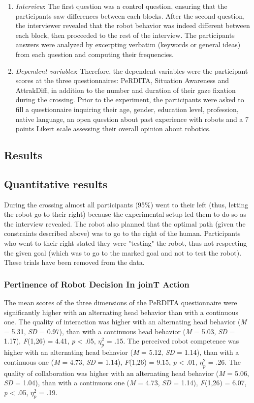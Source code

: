 \documentclass[a4paper,11pt,twoside]{StyleThese}
\begin{document}
\begin{enumerate}
\item \textit{Interview}:
The first question was a control question, ensuring that the participants saw differences between each blocks. After the second question, the interviewer revealed that the robot behavior was indeed different between each block, then proceeded to the rest of the interview. The participants answers were analyzed by excerpting verbatim (keywords or general ideas) from each question and computing their frequencies.

\item \textit{Dependent variables}:
Therefore, the dependent variables were the participant scores at the three questionnaires: PeRDITA, Situation Awareness and AttrakDiff, in addition to the number and duration of their gaze fixation during the crossing.
Prior to the experiment, the participants were asked to fill a questionnaire inquiring their age, gender, education level, profession, native language, an open question about past experience with robots and a 7 points Likert scale assessing their overall opinion about robotics.
\end{enumerate}

\subsection{Results}
\subsection{Quantitative results}
During the crossing almost all participants (95\%) went to their left (thus, letting the robot go to their right) because the experimental setup led them to do so as the interview revealed. The robot also planned that the optimal path (given the constraints described above) was to go to the right of the human. Participants who went to their right stated they were "testing" the robot, thus not respecting the given goal (which was to go to the marked goal and not to test the robot). These trials have been removed from the data.

\subsubsection{Pertinence of Robot Decision In joinT Action}
The mean scores of the three dimensions of the PeRDITA questionnaire were significantly higher with an alternating head behavior than with a continuous one. The quality of interaction was higher with an alternating head behavior (\textit{M} = 5.31, \textit{SD} = 0.97), than with a continuous head behavior (\textit{M} = 5.03, \textit{SD} = 1.17), \textit{F}(1,26) = 4.41, \textit{p} < .05, $\eta_{p}^{2}$ = .15. The perceived robot competence was higher with an alternating head behavior (\textit{M} = 5.12, \textit{SD} = 1.14), than with a continuous one (\textit{M} = 4.73, \textit{SD} = 1.14), \textit{F}(1,26) = 9.15, \textit{p} < .01, $\eta_{p}^{2}$ = .26. The quality of collaboration was higher with an alternating head behavior  (\textit{M} = 5.06, \textit{SD} = 1.04), than with a continuous one (\textit{M} = 4.73, \textit{SD} = 1.14), \textit{F}(1,26) = 6.07, \textit{p} < .05, $\eta_{p}^{2}$ = .19.
\end{document}
